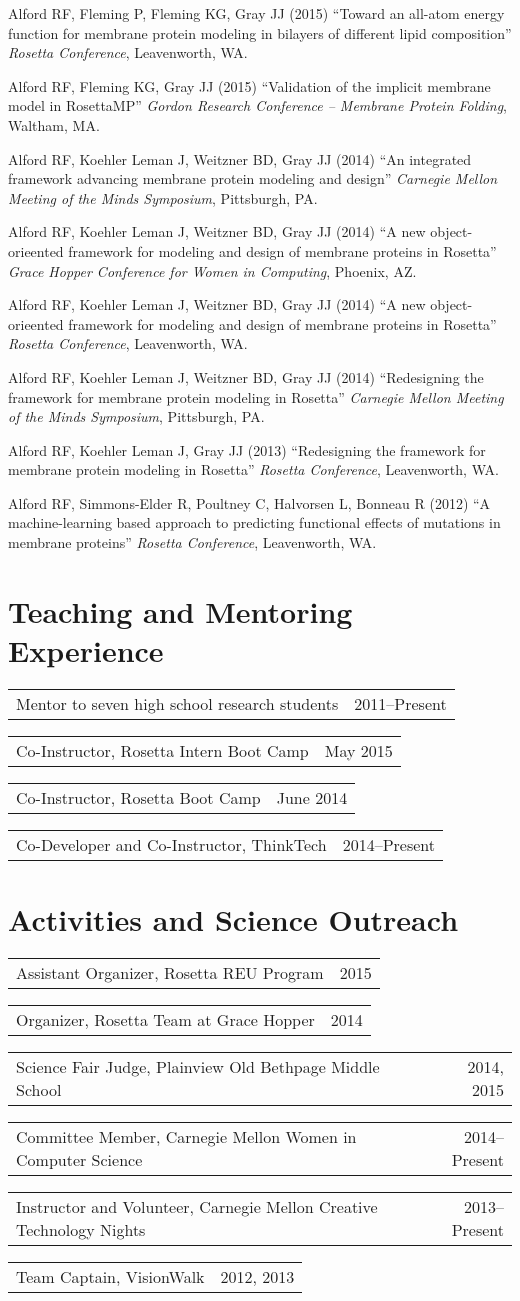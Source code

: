 \documentclass[11pt]{article}
\makeatletter
\newcommand{\allcapsspacing}[1]{{\addfontfeature{LetterSpace=7.5}#1}}
\newcommand{\yearitem}[2]{
\noindent
\begin{tabular*}{\textwidth}{@{\extracolsep{\fill}}lr}
		#1 & #2 \\
\end{tabular*}\vspace{0.5\baselineskip}}
\makeatother
\begin{document}
\begin{etaremune}
\item Alford RF, Fleming P, Fleming KG, Gray JJ (2015) ``Toward an all-atom energy function for membrane protein modeling in bilayers of different lipid composition'' \textit{Rosetta Conference}, Leavenworth, WA.
\item Alford RF, Fleming KG, Gray JJ (2015) ``Validation of the implicit membrane model in RosettaMP'' \textit{Gordon Research Conference -- Membrane Protein Folding}, Waltham, MA.
\item Alford RF, Koehler Leman J, Weitzner BD, Gray JJ (2014) ``An integrated framework advancing membrane protein modeling and design'' \textit{Carnegie Mellon Meeting of the Minds Symposium}, Pittsburgh, PA.
\item Alford RF, Koehler Leman J, Weitzner BD, Gray JJ (2014) ``A new object-orieented framework for modeling and design of membrane proteins in Rosetta'' \textit{Grace Hopper Conference for Women in Computing}, Phoenix, AZ.
\item Alford RF, Koehler Leman J, Weitzner BD, Gray JJ (2014) ``A new object-orieented framework for modeling and design of membrane proteins in Rosetta'' \textit{Rosetta Conference}, Leavenworth, WA.
\item Alford RF, Koehler Leman J, Weitzner BD, Gray JJ (2014) ``Redesigning the framework for membrane protein modeling in Rosetta'' \textit{Carnegie Mellon Meeting of the Minds Symposium}, Pittsburgh, PA.
\item Alford RF, Koehler Leman J, Gray JJ (2013) ``Redesigning the framework for membrane protein modeling in Rosetta'' \textit{Rosetta Conference}, Leavenworth, WA.
\item Alford RF, Simmons-Elder R, Poultney C, Halvorsen L, Bonneau R (2012) ``A machine-learning based approach to predicting functional effects of mutations in membrane proteins'' \textit{Rosetta Conference}, Leavenworth, WA.
\end{etaremune}

\section*{\allcapsspacing{Teaching and Mentoring Experience}}

\yearitem{Mentor to seven high school research students}{2011--Present}
\yearitem{Co-Instructor, Rosetta Intern Boot Camp}{May 2015}
\yearitem{Co-Instructor, Rosetta Boot Camp}{June 2014}
\yearitem{Co-Developer and Co-Instructor, ThinkTech}{2014--Present}

\section*{\allcapsspacing{Activities and Science Outreach}}
\yearitem{Assistant Organizer, Rosetta REU Program}{2015}
\yearitem{Organizer, Rosetta Team at Grace Hopper}{2014}
\yearitem{Science Fair Judge, Plainview Old Bethpage Middle School}{2014, 2015}
\yearitem{Committee Member, Carnegie Mellon Women in Computer Science}{2014--Present}
\yearitem{Instructor and Volunteer, Carnegie Mellon Creative Technology Nights}{2013--Present}
\yearitem{Team Captain, VisionWalk}{2012, 2013}
\end{document}

